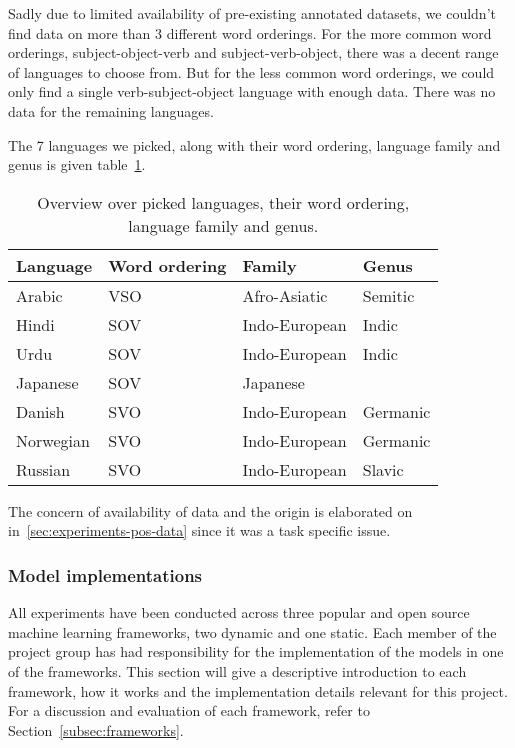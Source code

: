Sadly due to limited availability of pre-existing annotated datasets, we
couldn't find data on more than 3 different word orderings. For the more common
word orderings, subject-object-verb and subject-verb-object, there was a decent
range of languages to choose from. But for the less common word orderings, we
could only find a single verb-subject-object language with enough data. There
was no data for the remaining languages. 

The 7 languages we picked, along with their word ordering, language family and
genus is given table~\ref{table:langfam}.

\begin{table}[!ht]
  \centering
  \begin{tabular}{llll}
    \textbf{Language} & \textbf{Word ordering} & \textbf{Family} & \textbf{Genus} \\
    \midrule
    Arabic    & VSO & Afro-Asiatic  & Semitic \\
    Hindi     & SOV & Indo-European & Indic \\
    Urdu      & SOV & Indo-European & Indic \\
    Japanese  & SOV & Japanese      & \\
    Danish    & SVO & Indo-European & Germanic \\
    Norwegian & SVO & Indo-European & Germanic \\
    Russian   & SVO & Indo-European & Slavic \\
  \end{tabular}
  \caption{Overview over picked languages, their word ordering, language
  family and genus.
  }\label{table:langfam}
\end{table}

The concern of availability of data and the origin is elaborated on
in~\ref{sec:experiments-pos-data} since it was a task specific issue.


\subsubsection{Model implementations}

All experiments have been conducted across three popular and open source machine
learning frameworks, two dynamic and one static. Each member of the project
group has had responsibility for the implementation of the models in one of the
frameworks. This section will give a descriptive introduction to each framework,
how it works and the implementation details relevant for this project. For a
discussion and evaluation of each framework, refer to
Section~\ref{subsec:frameworks}.

